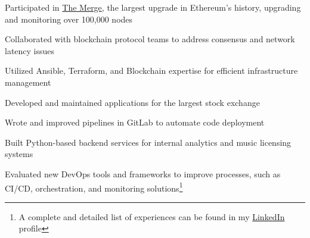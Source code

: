 \documentclass[]{willianpaixao-resume}
\begin{document}
\begin{minipage}[t]{0.64\textwidth}
\begin{tightemize}
\item Participated in \underline{The Merge}, the largest upgrade in Ethereum's history, upgrading and monitoring over 100,000 nodes
\item Collaborated with blockchain protocol teams to address consensus and network latency issues
\item Utilized Ansible, Terraform, and Blockchain expertise for efficient infrastructure management
\end{tightemize}
\sectionsep

\begin{tightemize}
\item Developed and maintained applications for the largest stock exchange
\item Wrote and improved pipelines in GitLab to automate code deployment
\end{tightemize}
\sectionsep

\begin{tightemize}
\item Built Python-based backend services for internal analytics and music licensing systems
\item Evaluated new DevOps tools and frameworks to improve processes, such as CI/CD, orchestration, and monitoring solutions\footnote{A complete and detailed list of experiences can be found in my \href{https://www.linkedin.com/in/willianpaixao/details/experience/}{LinkedIn} profile}
\end{tightemize}
\sectionsep

\end{minipage}
\end{document}
